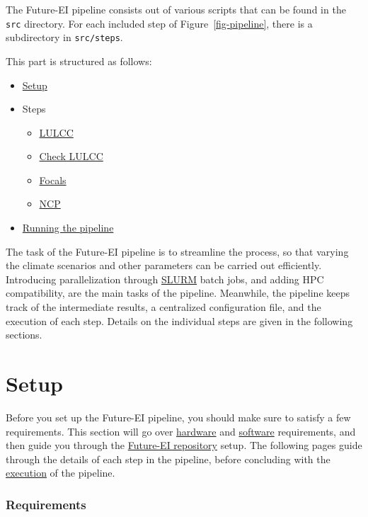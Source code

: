 \documentclass[
  letterpaper,
  DIV=11,
  numbers=noendperiod]{scrreprt}
\providecommand{\tightlist}{%
  \setlength{\itemsep}{0pt}\setlength{\parskip}{0pt}}\usepackage{longtable,booktabs,array}
\begin{document}
The Future-EI pipeline consists out of various scripts that can be found
in the \texttt{src} directory. For each included step of
Figure~\ref{fig-pipeline}, there is a subdirectory in
\texttt{src/steps}.

This part is structured as follows:

\begin{itemize}
\tightlist
\item
  \href{setup.html}{Setup}
\item
  Steps

  \begin{itemize}
  \tightlist
  \item
    \href{10_LULCC.html}{LULCC}
  \item
    \href{11_CheckLULCC.html}{Check LULCC}
  \item
    \href{20_FocalLULC.html}{Focals}
  \item
    \href{40_NCPs.html}{NCP}
  \end{itemize}
\item
  \href{running.html}{Running the pipeline}
\end{itemize}

The task of the Future-EI pipeline is to streamline the process, so that
varying the climate scenarios and other parameters can be carried out
efficiently. Introducing parallelization through
\href{https://slurm.schedmd.com/overview.html}{SLURM} batch jobs, and
adding HPC compatibility, are the main tasks of the pipeline. Meanwhile,
the pipeline keeps track of the intermediate results, a centralized
configuration file, and the execution of each step. Details on the
individual steps are given in the following sections.


\chapter{Setup}\label{setup}

Before you set up the Future-EI pipeline, you should make sure to
satisfy a few requirements. This section will go over
\hyperref[hardware]{hardware} and \hyperref[software]{software}
requirements, and then guide you through the
\hyperref[future-ei-repository]{Future-EI repository} setup. The
following pages guide through the details of each step in the pipeline,
before concluding with the \href{running.html}{execution} of the
pipeline.

\subsection{Requirements}\label{requirements}
\end{document}
